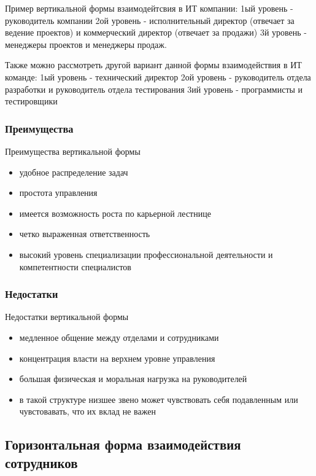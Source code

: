 \documentclass{industrial-development}
\begin{document}
\lecturenotes
Пример вертикальной формы взаимодейтсвия в ИТ компании:
1ый уровень - руководитель компании
2ой уровень - исполнительный директор (отвечает за ведение проектов) и коммерческий директор (отвечает за продажи)
3й уровень - менеджеры проектов и менеджеры продаж.

Также можно рассмотреть другой вариант данной формы взаимодействия в ИТ команде:
1ый уровень -  технический директор
2ой уровень -  руководитель отдела разработки и руководитель отдела тестирования
3ий уровень - программисты и тестировщики


\begin{frame} \frametitle{Преимущества}
  \begin{block}{Преимущества вертикальной формы}
  \end{block}
  
  \begin{itemize}
  \item удобное распределение задач
  \item простота управления
  \item имеется возможность роста по карьерной лестнице
  \item четко выраженная ответственность
  \item высокий уровень специализации профессиональной деятельности и компетентности специалистов

  \end{itemize}
\end{frame}


\begin{frame} \frametitle{Недостатки}
  \begin{block}{Недостатки вертикальной формы}
  \end{block}
  
  \begin{itemize}
  \item медленное общение между отделами и сотрудниками
  \item концентрация власти на верхнем уровне управления
  \item большая физическая и моральная нагрузка на руководителей
  \item в такой структуре низшее звено может чувствовать себя подавленным или чувстовавать, что их вклад не важен
  \end{itemize}
\end{frame}

\subsection{Горизонтальная форма взаимодействия сотрудников}
\end{document}
